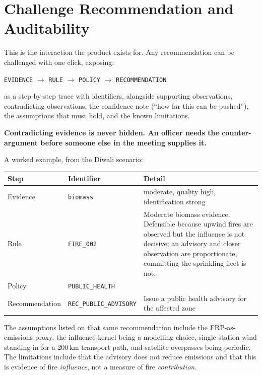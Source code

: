 \documentclass[11pt,a4paper]{article}
\newcommand{\keyclaim}[1]{%
  \par\vspace{0.7ex}\noindent
  \colorbox{vwash}{\parbox{\dimexpr\linewidth-2\fboxsep}{%
    \color{vblack}\textbf{#1}}}%
  \par\vspace{0.9ex}}
\newcommand{\code}[1]{\texttt{\small #1}}
\begin{document}
\section{Challenge Recommendation and Auditability}

This is the interaction the product exists for. Any recommendation can be
challenged with one click, exposing:

\begin{center}
\small
\code{EVIDENCE} $\rightarrow$ \code{RULE} $\rightarrow$ \code{POLICY} $\rightarrow$
\code{RECOMMENDATION}
\end{center}

\noindent
as a step-by-step trace with identifiers, alongside supporting observations,
contradicting observations, the confidence note (``how far this can be pushed''),
the assumptions that must hold, and the known limitations.

\keyclaim{Contradicting evidence is never hidden. An officer needs the
counter-argument before someone else in the meeting supplies it.}

A worked example, from the Diwali scenario:

\begin{center}
\small
\begin{tabularx}{\linewidth}{@{}l l X@{}}
\toprule
\textbf{Step} & \textbf{Identifier} & \textbf{Detail} \\
\midrule
Evidence & \code{biomass} & moderate, quality high, identification strong \\
Rule & \code{FIRE\_002} & Moderate biomass evidence. Defensible because upwind fires
are observed but the influence is not decisive; an advisory and closer observation
are proportionate, committing the sprinkling fleet is not. \\
Policy & \code{PUBLIC\_HEALTH} & \\
Recommendation & \code{REC\_PUBLIC\_ADVISORY} & Issue a public health advisory for
the affected zone \\
\bottomrule
\end{tabularx}
\end{center}

The assumptions listed on that same recommendation include the FRP-as-emissions
proxy, the influence kernel being a modelling choice, single-station wind standing
in for a 200\,km transport path, and satellite overpasses being periodic. The
limitations include that the advisory does not reduce emissions and that this is
evidence of fire \emph{influence}, not a measure of fire \emph{contribution}.
\end{document}
